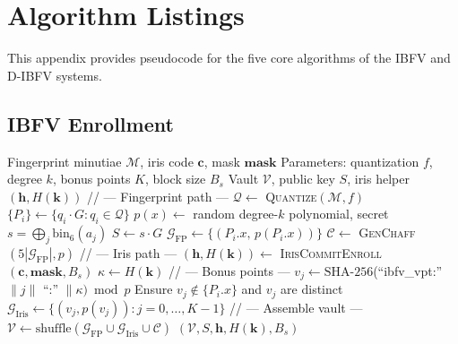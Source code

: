 \chapter{Algorithm Listings}
\label{appn:B}

This appendix provides pseudocode for the five core algorithms of the IBFV and
D-IBFV systems.

\section{IBFV Enrollment}

\begin{algorithm}[H]
\caption{IBFV Enrollment}
\label{alg:ibfv_enroll}
\begin{algorithmic}[1]
\Require Fingerprint minutiae $\mathcal{M}$, iris code $\mathbf{c}$, mask $\mathbf{mask}$
\Require Parameters: quantization $f$, degree $k$, bonus points $K$, block size $B_s$
\Ensure Vault $\mathcal{V}$, public key $S$, iris helper $(\mathbf{h}, H(\mathbf{k}))$
\State // --- Fingerprint path ---
\State $\mathcal{Q} \leftarrow$ \textsc{Quantize}$(\mathcal{M}, f)$ 
\State $\{P_i\} \leftarrow \{q_i \cdot G : q_i \in \mathcal{Q}\}$ 
\State $p(x) \leftarrow$ random degree-$k$ polynomial, secret $s = \bigoplus_j \mathrm{bin}_6(a_j)$
\State $S \leftarrow s \cdot G$ 
\State $\mathcal{G}_{\mathrm{FP}} \leftarrow \{(P_i.x,\, p(P_i.x))\}$
\State $\mathcal{C} \leftarrow$ \textsc{GenChaff}$(5|\mathcal{G}_{\mathrm{FP}}|, p)$ 
\State // --- Iris path ---
\State $(\mathbf{h}, H(\mathbf{k})) \leftarrow$ \textsc{IrisCommitEnroll}$(\mathbf{c}, \mathbf{mask}, B_s)$
\State $\kappa \leftarrow H(\mathbf{k})$ 
\State // --- Bonus points ---
  \State $v_j \leftarrow \mathrm{SHA}\text{-}256$(``ibfv\_vpt:'' $\| j \|$ ``:'' $\| \kappa) \bmod p$
  \State Ensure $v_j \notin \{P_i.x\}$ and $v_j$ are distinct
\EndFor
\State $\mathcal{G}_{\mathrm{Iris}} \leftarrow \{(v_j, p(v_j)) : j=0,\ldots,K-1\}$
\State // --- Assemble vault ---
\State $\mathcal{V} \leftarrow \mathrm{shuffle}(\mathcal{G}_{\mathrm{FP}} \cup \mathcal{G}_{\mathrm{Iris}} \cup \mathcal{C})$
\State \Return $(\mathcal{V}, S, \mathbf{h}, H(\mathbf{k}), B_s)$
\end{algorithmic}
\end{algorithm}

